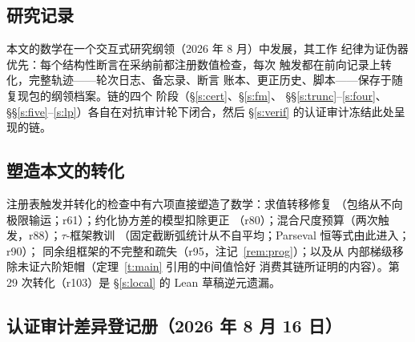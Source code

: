 \documentclass[11pt]{article}
\numberwithin{equation}{section}
\theoremstyle{definition}
\theoremstyle{remark}
\begin{document}
\subsection*{研究记录}

本文的数学在一个交互式研究纲领（2026 年 8 月）中发展，其工作
纪律为证伪器优先：每个结构性断言在采纳前都注册数值检查，每次
触发都在前向记录上转化，完整轨迹——轮次日志、备忘录、断言
账本、更正历史、脚本——保存于随复现包的纲领档案。链的四个
阶段（\S\ref{s:cert}、\S\ref{s:fm}、
\S\S\ref{s:trunc}--\ref{s:four}、
\S\S\ref{s:five}--\ref{s:lp}）各自在对抗审计轮下闭合，然后
\S\ref{s:verif} 的认证审计冻结此处呈现的链。

\subsection*{塑造本文的转化}

注册表触发并转化的检查中有六项直接塑造了数学：求值转移修复
（包络从不向极限输运；r61）；约化协方差的模型扣除更正
（r80）；混合尺度预算（两次触发，r88）；$\tau$-框架教训
（固定截断弧统计从不自平均；Parseval 恒等式由此进入；r90）；
同余组框架的不完整和疏失（r95，注记~\ref{rem:prog}）；以及从
内部梯级移除未证六阶矩帽（定理~\ref{t:main} 引用的中间值恰好
消费其链所证明的内容）。第 29 次转化（r103）是
\S\ref{s:local} 的 Lean 草稿逆元遗漏。

\subsection*{认证审计差异登记册（2026 年 8 月 16 日）}
\end{document}
